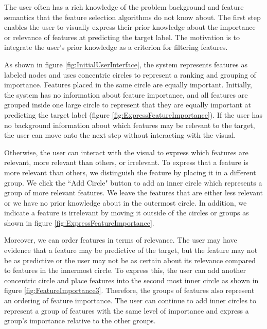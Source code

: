 The user often has a rich knowledge of the problem background and feature semantics that the feature selection algorithms do not know about. The first step enables the user to visually express their prior knowledge about the importance or relevance of features at predicting the target label. The motivation is to integrate the user's prior knowledge as a criterion for filtering features. 

As shown in figure \ref{fig:InitialUserInterface}, the system represents features as labeled nodes and uses concentric circles to represent a ranking and grouping of importance. Features placed in the same circle are equally important. Initially, the system has no information about feature importance, and all features are grouped inside one large circle to represent that they are equally important at predicting the target label (figure \ref{fig:ExpressFeatureImportance}). If the user has no background information about which features may be relevant to the target, the user can move onto the next step without interacting with the visual. 

Otherwise, the user can interact with the visual to express which features are relevant, more relevant than others, or irrelevant. To express that a feature is more relevant than others, we distinguish the feature by placing it in a different group. We click the ``Add Circle" button to add an inner circle which represents a group of more relevant features. We leave the features that are either less relevant or we have no prior knowledge about in the outermost circle. In addition, we indicate a feature is irrelevant by moving it outside of the circles or groups as shown in figure \ref{fig:ExpressFeatureImportance}. 

Moreover, we can order features in terms of relevance. The user may have evidence that a feature may be predictive of the target, but the feature may not be as predictive or the user may not be as certain about its relevance compared to features in the innermost circle. To express this, the user can add another concentric circle and place features into the second most inner circle as shown in figure \ref{fig:FeatureImportance3}. Therefore, the groups of features also represent an ordering of feature importance. The user can continue to add inner circles to represent a group of features with the same level of importance and express a group's importance relative to the other groups. 


